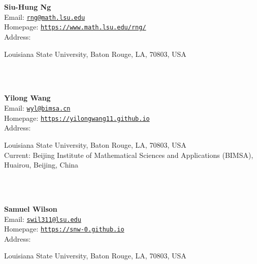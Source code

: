 \documentclass[a4paper,11pt]{report}
\begin{document}
\begin{titlepage}
\mbox{}\\
{\mbox{}\\
\small \noindent \textbf{ Siu-Hung Ng\\
    }  Email: \href{mailto://rng@math.lsu.edu} {\texttt{rng@math.lsu.edu}}\\
  Homepage: \href{https://www.math.lsu.edu/~rng/} {\texttt{https://www.math.lsu.edu/\texttt{}rng/}}\\
  Address: \begin{minipage}[t]{8cm}\noindent
 Louisiana State University, Baton Rouge, LA, 70803, USA\\
 \end{minipage}
}\\
{\mbox{}\\
\small \noindent \textbf{ Yilong Wang\\
    }  Email: \href{mailto://wyl@bimsa.cn} {\texttt{wyl@bimsa.cn}}\\
  Homepage: \href{https://yilongwang11.github.io} {\texttt{https://yilongwang11.github.io}}\\
  Address: \begin{minipage}[t]{8cm}\noindent
 Louisiana State University, Baton Rouge, LA, 70803, USA \\
 Current: Beijing Institute of Mathematical Sciences and Applications (BIMSA),
Huairou, Beijing, China\\
 \end{minipage}
}\\
{\mbox{}\\
\small \noindent \textbf{ Samuel Wilson\\
    }  Email: \href{mailto://swil311@lsu.edu} {\texttt{swil311@lsu.edu}}\\
  Homepage: \href{https://snw-0.github.io} {\texttt{https://snw-0.github.io}}\\
  Address: \begin{minipage}[t]{8cm}\noindent
 Louisiana State University, Baton Rouge, LA, 70803, USA\\
 \end{minipage}
}\\
\end{titlepage}
\end{document}

